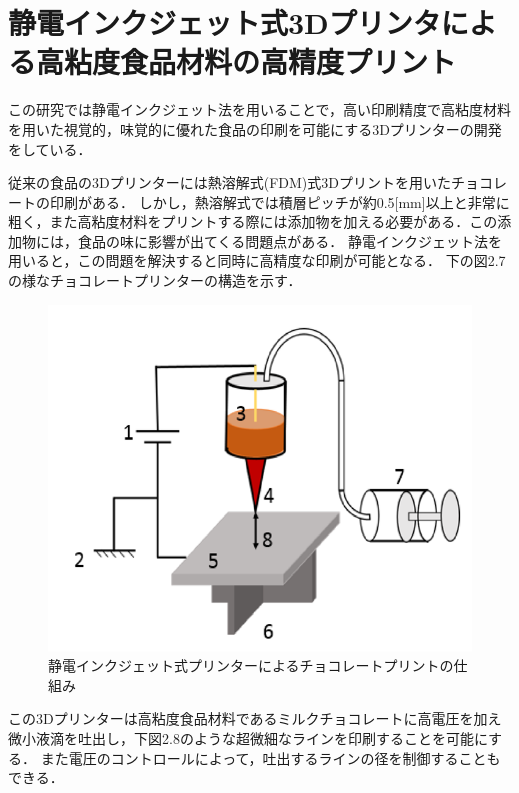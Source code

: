\section{静電インクジェット式3Dプリンタによる高粘度食品材料の高精度プリント\cite{e}}
\label{sec:enum}
この研究では静電インクジェット法を用いることで，高い印刷精度で高粘度材料を用いた視覚的，味覚的に優れた食品の印刷を可能にする3Dプリンターの開発をしている．

従来の食品の3Dプリンターには熱溶解式(FDM)式3Dプリントを用いたチョコレートの印刷がある．
しかし，熱溶解式では積層ピッチが約0.5[mm]以上と非常に粗く，また高粘度材料をプリントする際には添加物を加える必要がある．この添加物には，食品の味に影響が出てくる問題点がある．
静電インクジェット法を用いると，この問題を解決すると同時に高精度な印刷が可能となる．
下の図2.7の様なチョコレートプリンターの構造を示す．


\begin{figure}[H]
  \centering
  \includegraphics[width=11truecm]{./fig/seidenn.png}
  \caption{静電インクジェット式プリンターによるチョコレートプリントの仕組み}
  \label{fig:ferretss}
\end{figure}

この3Dプリンターは高粘度食品材料であるミルクチョコレートに高電圧を加え微小液滴を吐出し，下図2.8のような超微細なラインを印刷することを可能にする．
また電圧のコントロールによって，吐出するラインの径を制御することもできる．

